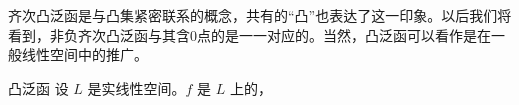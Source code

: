 
齐次凸泛函是与凸集紧密联系的概念，共有的“凸”也表达了这一印象。以后我们将看到，非负齐次凸泛函与其含0点的是一一对应的。当然，凸泛函可以看作是在一般线性空间中的推广。

\begin{definition}{凸泛函}
设 $L$ 是实线性空间。$f$ 是 $L$ 上的，
\end{definition}
